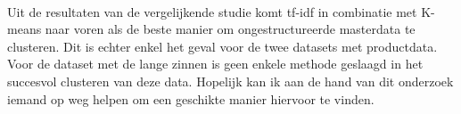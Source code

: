 \\\indent
Uit de resultaten van de vergelijkende studie komt tf-idf in combinatie met K-means naar voren als de beste manier om ongestructureerde masterdata te clusteren. Dit is echter enkel het geval voor de twee datasets met productdata. Voor de dataset met de lange zinnen is geen enkele methode geslaagd in het succesvol clusteren van deze data. Hopelijk kan ik aan de hand van dit onderzoek iemand op weg helpen om een geschikte manier hiervoor te vinden.
\\\indent



